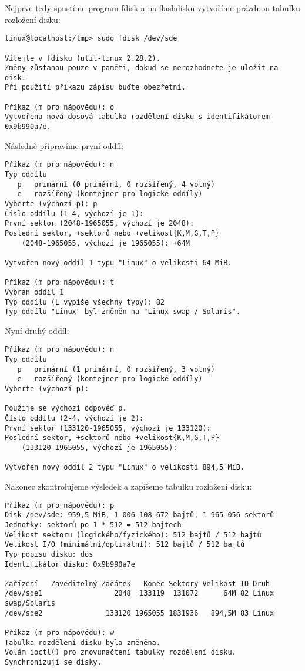 Nejprve tedy spustíme program fdisk a na flashdisku vytvoříme prázdnou tabulku
rozložení disku:
\begin{verbatim}
linux@localhost:/tmp> sudo fdisk /dev/sde

Vítejte v fdisku (util-linux 2.28.2).
Změny zůstanou pouze v paměti, dokud se nerozhodnete je uložit na disk.
Při použití příkazu zápisu buďte obezřetní.

Příkaz (m pro nápovědu): o
Vytvořena nová dosová tabulka rozdělení disku s identifikátorem 0x9b990a7e.
\end{verbatim}

Následně připravíme první oddíl:
\begin{verbatim}
Příkaz (m pro nápovědu): n
Typ oddílu
   p   primární (0 primární, 0 rozšířený, 4 volný)
   e   rozšířený (kontejner pro logické oddíly)
Vyberte (výchozí p): p
Číslo oddílu (1-4, výchozí je 1):
První sektor (2048-1965055, výchozí je 2048):
Poslední sektor, +sektorů nebo +velikost{K,M,G,T,P}
	(2048-1965055, výchozí je 1965055): +64M

Vytvořen nový oddíl 1 typu "Linux" o velikosti 64 MiB.

Příkaz (m pro nápovědu): t
Vybrán oddíl 1
Typ oddílu (L vypíše všechny typy): 82
Typ oddílu "Linux" byl změněn na "Linux swap / Solaris".
\end{verbatim}

Nyní druhý oddíl:
\begin{verbatim}
Příkaz (m pro nápovědu): n
Typ oddílu
   p   primární (1 primární, 0 rozšířený, 3 volný)
   e   rozšířený (kontejner pro logické oddíly)
Vyberte (výchozí p):

Použije se výchozí odpověď p.
Číslo oddílu (2-4, výchozí je 2):
První sektor (133120-1965055, výchozí je 133120):
Poslední sektor, +sektorů nebo +velikost{K,M,G,T,P}
	(133120-1965055, výchozí je 1965055):

Vytvořen nový oddíl 2 typu "Linux" o velikosti 894,5 MiB.
\end{verbatim}

Nakonec zkontrolujeme výsledek a zapíšeme tabulku rozložení disku:
\begin{verbatim}
Příkaz (m pro nápovědu): p
Disk /dev/sde: 959,5 MiB, 1 006 108 672 bajtů, 1 965 056 sektorů
Jednotky: sektorů po 1 * 512 = 512 bajtech
Velikost sektoru (logického/fyzického): 512 bajtů / 512 bajtů
Velikost I/O (minimální/optimální): 512 bajtů / 512 bajtů
Typ popisu disku: dos
Identifikátor disku: 0x9b990a7e

Zařízení   Zaveditelný Začátek   Konec Sektory Velikost ID Druh
/dev/sde1                 2048  133119  131072      64M 82 Linux swap/Solaris
/dev/sde2               133120 1965055 1831936   894,5M 83 Linux

Příkaz (m pro nápovědu): w
Tabulka rozdělení disku byla změněna.
Volám ioctl() pro znovunačtení tabulky rozdělení disku.
Synchronizují se disky.
\end{verbatim}

